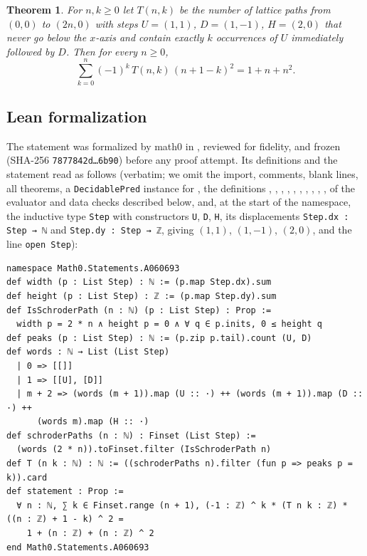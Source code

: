 \documentclass[11pt]{amsart}
\theoremstyle{plain}
\newtheorem{theorem}{Theorem}
\theoremstyle{definition}
\begin{document}
\begin{theorem}\label{thm:main}
For $n,k\ge0$ let $T(n,k)$ be the number of lattice paths from $(0,0)$ to $(2n,0)$ with steps $U=(1,1)$, $D=(1,-1)$, $H=(2,0)$ that never go below the $x$-axis and contain exactly $k$ occurrences of $U$ immediately followed by $D$. Then for every $n\ge0$,
\[
  \sum_{k=0}^{n}(-1)^k\,T(n,k)\,(n+1-k)^2=1+n+n^2 .
\]
\end{theorem}

\subsection*{Lean formalization}
The statement was formalized by math0 in , reviewed for fidelity, and frozen (SHA-256 \texttt{7877842d\ldots 6b90}) before any proof attempt. Its definitions and the statement read as follows (verbatim; we omit the import, comments, blank lines, all theorems, a \texttt{DecidablePred} instance for , the definitions , , , , , , , , , ,  of the evaluator and data checks described below, and, at the start of the namespace, the inductive type \texttt{Step} with constructors \texttt{U}, \texttt{D}, \texttt{H}, its displacements \texttt{Step.dx : Step → ℕ} and \texttt{Step.dy : Step → ℤ}, giving $(1,1)$, $(1,-1)$, $(2,0)$, and the line \texttt{open Step}):
\begin{lstlisting}
namespace Math0.Statements.A060693
def width (p : List Step) : ℕ := (p.map Step.dx).sum
def height (p : List Step) : ℤ := (p.map Step.dy).sum
def IsSchroderPath (n : ℕ) (p : List Step) : Prop :=
  width p = 2 * n ∧ height p = 0 ∧ ∀ q ∈ p.inits, 0 ≤ height q
def peaks (p : List Step) : ℕ := (p.zip p.tail).count (U, D)
def words : ℕ → List (List Step)
  | 0 => [[]]
  | 1 => [[U], [D]]
  | m + 2 => (words (m + 1)).map (U :: ·) ++ (words (m + 1)).map (D :: ·) ++
      (words m).map (H :: ·)
def schroderPaths (n : ℕ) : Finset (List Step) :=
  (words (2 * n)).toFinset.filter (IsSchroderPath n)
def T (n k : ℕ) : ℕ := ((schroderPaths n).filter (fun p => peaks p = k)).card
def statement : Prop :=
  ∀ n : ℕ, ∑ k ∈ Finset.range (n + 1), (-1 : ℤ) ^ k * (T n k : ℤ) * ((n : ℤ) + 1 - k) ^ 2 =
    1 + (n : ℤ) + (n : ℤ) ^ 2
end Math0.Statements.A060693
\end{lstlisting}
\end{document}
